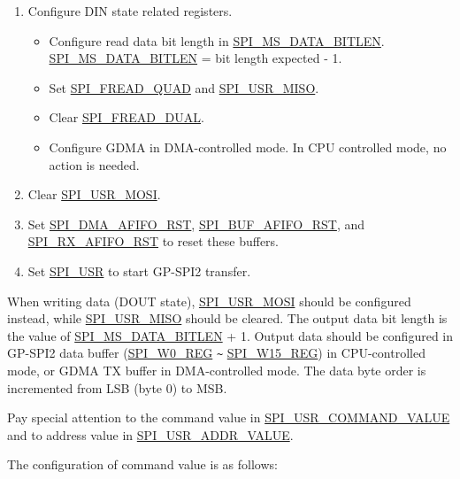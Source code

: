 \documentclass[main\_\_EN.tex]{subfiles}
\begin{document}
\begin{enumerate}
    \item Configure DIN state related registers.
        \begin{itemize}
            \item Configure read data bit length in \hyperref[fielddesc:SPIMSDATABITLEN]{SPI\_MS\_DATA\_BITLEN}. \hyperref[fielddesc:SPIMSDATABITLEN]{SPI\_MS\_DATA\_BITLEN} = bit length expected - 1.
            \item Set \hyperref[fielddesc:SPIFREADQUAD]{SPI\_FREAD\_QUAD} and \hyperref[fielddesc:SPIUSRMISO]{SPI\_USR\_MISO}.
            \item Clear \hyperref[fielddesc:SPIFREADDUAL]{SPI\_FREAD\_DUAL}.
            \item Configure GDMA in DMA-controlled mode. In CPU controlled mode, no action is needed.
        \end{itemize}

    \item Clear \hyperref[fielddesc:SPIUSRMOSI]{SPI\_USR\_MOSI}.
    \item Set \hyperref[fielddesc:SPIDMAAFIFORST]{SPI\_DMA\_AFIFO\_RST}, \hyperref[fielddesc:SPIBUFAFIFORST]{SPI\_BUF\_AFIFO\_RST}, and \hyperref[fielddesc:SPIRXAFIFORST]{SPI\_RX\_AFIFO\_RST} to reset these buffers.

    \item Set \hyperref[fielddesc:SPIUSR]{SPI\_USR} to start GP-SPI2 transfer.
\end{enumerate}

When writing data (DOUT state), \hyperref[fielddesc:SPIUSRMOSI]{SPI\_USR\_MOSI} should be configured instead, while \hyperref[fielddesc:SPIUSRMISO]{SPI\_USR\_MISO} should be cleared. The output data bit length is the value of \hyperref[fielddesc:SPIMSDATABITLEN]{SPI\_MS\_DATA\_BITLEN} + 1. Output data should be configured in GP-SPI2 data buffer (\hyperref[regdesc:SPIW0REG]{SPI\_W0\_REG} \verb+~+ \hyperref[regdesc:SPIW15REG]{SPI\_W15\_REG}) in CPU-controlled mode, or GDMA TX buffer in DMA-controlled mode. The data byte order is incremented from LSB (byte 0) to MSB.

Pay special attention to the command value in \hyperref[fielddesc:SPIUSRCOMMANDVALUE]{SPI\_USR\_COMMAND\_VALUE} and to address value in \hyperref[fielddesc:SPIUSRADDRVALUE]{SPI\_USR\_ADDR\_VALUE}.

The configuration of command value is as follows:
\end{document}
